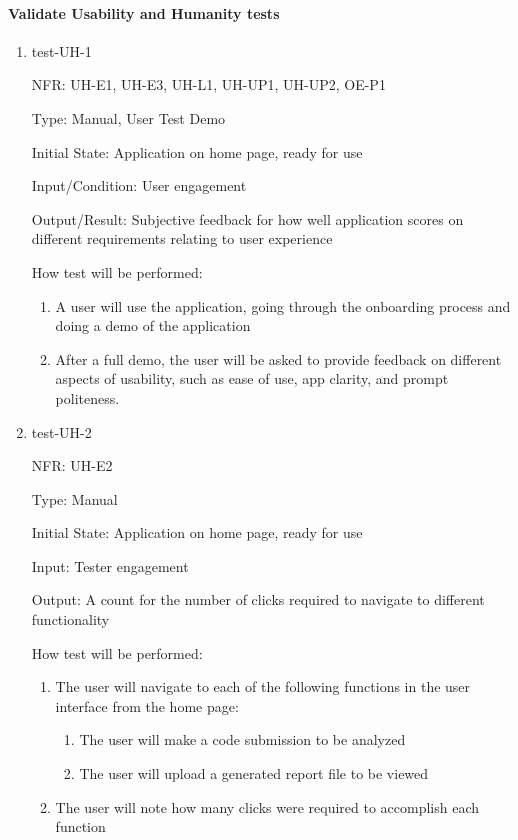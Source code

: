 \documentclass[12pt, titlepage]{article}
\begin{document}
\paragraph{Validate Usability and Humanity tests}
\begin{enumerate}

  \item{test-UH-1}
  
  NFR: UH-E1, UH-E3, UH-L1, UH-UP1, UH-UP2, OE-P1
  
  Type: Manual, User Test Demo
            
  Initial State: Application on home page, ready for use
            
  Input/Condition: User engagement
            
  Output/Result: Subjective feedback for how well application scores on different requirements relating to user experience
            
  How test will be performed: 
  \begin{enumerate}
    \item A user will use the application, going through the onboarding process
    and doing a demo of the application
    \item After a full demo, the user will be asked to provide feedback on
    different aspects of usability, such as ease of use, app clarity, and prompt
    politeness.
  \end{enumerate}
            
  \item{test-UH-2}
  
  NFR: UH-E2
  
  Type: Manual
            
  Initial State: Application on home page, ready for use
            
  Input: Tester engagement
            
  Output: A count for the number of clicks required to navigate to different functionality
            
  How test will be performed: 
  \begin{enumerate}
    \item The user will navigate to each of the following functions in the user interface from the home page:
    \begin{enumerate}
      \item The user will make a code submission to be analyzed
      \item The user will upload a generated report file to be viewed
    \end{enumerate}
    \item The user will note how many clicks were required to accomplish each function
  \end{enumerate}


\end{enumerate}
\end{document}
